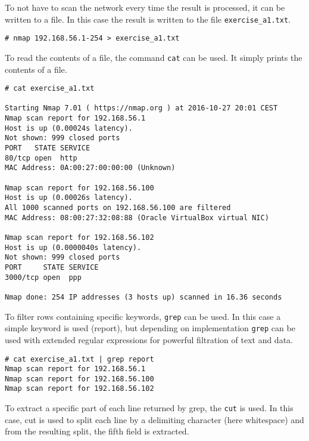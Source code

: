 To not have to scan the network every time the result is processed,
it can be written to a file. In this case the result is written
to the file \texttt{exercise\_a1.txt}.

\begin{lstlisting}[numbers=none, language={}, frame=single, framexleftmargin={0.2em}]
# nmap 192.168.56.1-254 > exercise_a1.txt
\end{lstlisting}

To read the contents of a file, the command \texttt{cat} can be used.
It simply prints the contents of a file.

\begin{lstlisting}[numbers=none, language={}, frame=single, framexleftmargin={0.2em}]
# cat exercise_a1.txt

Starting Nmap 7.01 ( https://nmap.org ) at 2016-10-27 20:01 CEST
Nmap scan report for 192.168.56.1
Host is up (0.00024s latency).
Not shown: 999 closed ports
PORT   STATE SERVICE
80/tcp open  http
MAC Address: 0A:00:27:00:00:00 (Unknown)

Nmap scan report for 192.168.56.100
Host is up (0.00026s latency).
All 1000 scanned ports on 192.168.56.100 are filtered
MAC Address: 08:00:27:32:08:88 (Oracle VirtualBox virtual NIC)

Nmap scan report for 192.168.56.102
Host is up (0.0000040s latency).
Not shown: 999 closed ports
PORT     STATE SERVICE
3000/tcp open  ppp

Nmap done: 254 IP addresses (3 hosts up) scanned in 16.36 seconds
\end{lstlisting}

To filter rows containing specific keywords, \texttt{grep} can be used.
In this case a simple keyword is used (report), but depending on implementation
\texttt{grep} can be used with extended regular expressions for powerful
filtration of text and data.

\begin{lstlisting}[numbers=none, language={}, frame=single, framexleftmargin={0.2em}]
# cat exercise_a1.txt | grep report
Nmap scan report for 192.168.56.1
Nmap scan report for 192.168.56.100
Nmap scan report for 192.168.56.102
\end{lstlisting}

To extract a specific part of each line returned by grep, the
\texttt{cut} is used. In this case, cut is used to split each
line by a delimiting character (here whitespace) and from the
resulting split, the fifth field is extracted.

